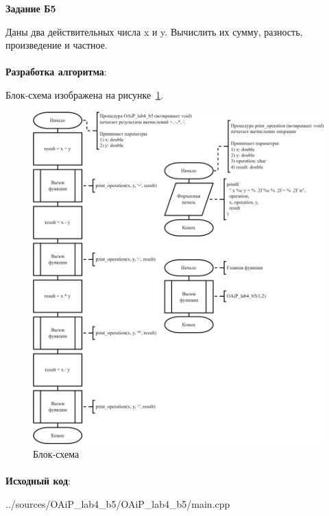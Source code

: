 \documentclass[12pt, a4paper, simple]{eskdtext}
\begin{document}
\begin{center}
    \textbf{Задание Б5}
\end{center}

Даны два действительных числа x и y.
Вычислить их сумму, разность, произведение и частное.

\paragraph{} \textbf{Разработка алгоритма}:

Блок-схема изображена на рисунке~\ref{fig:b5}.

\begin{figure}[ph]
    \centering
    \includegraphics[]
    {../sources/flowcharts/OAiP_lab4_b5.png}
    \caption{Блок-схема}
    \label{fig:b5}
\end{figure}

\paragraph{} \textbf{Исходный код}: 


{../sources/OAiP_lab4_b5/OAiP_lab4_b5/main.cpp}
\end{document}
